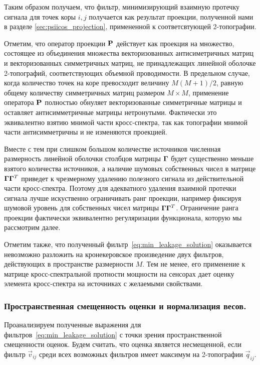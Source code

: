 Таким образом получаем, что фильтр, минимизирующий взаимную протечку сигнала
для точек коры $i, j$ получается как результат проекции, полученной нами в
разделе \ref{sec:psiicos_projection}, примененной к соответсвтующей
2-топографии.

Отметим, что оператор проекции $\mathbf{P}$ действует как проекция на множество,
состоящее из объединения множества векторизованных антисиметричных матриц и
векторизованных симметричных матриц, не принадлежащих линейной оболочке
2-топографий, соответствующих объемной проводимости. В предельном случае, когда
количество точек на коре превосходит величину $M (M + 1) / 2$, равную общему
количеству симметричных матриц размером $M \times M$, применение оператора
$\mathbf{P}$ полностью обнуляет векторизованные симметричные матрицы и оставляет
антисимметричные матрицы нетронутыми. Фактически это эквивалентно взятию
мнимой части кросс-спектра, так как топографии мнимой части антисимметричны и
не изменяются проекцией.

Вместе с тем при слишком большом количестве источников численная размерность
линейной оболочки столбцов матрицы $\mathbf{\Gamma}$ будет существенно меньше
взятого количества источников, а наличие шумовых собственных чисел в матрице
$\mathbf{\Gamma} \mathbf{\Gamma}^T$ приведет к чрезмерному удалению полезного
сигнала из действительной части кросс-спектра. Поэтому для адекватного удаления
взаимной протечки сигнала лучше искуственно ограничивать ранг проекции,
например фиксируя шумовой уровень для собственных чисел матрицы $\mathbf{\Gamma}
\mathbf{\Gamma}^T$. Ограничение ранга проекции фактически эквивалентно
регуляризации функционала, которую мы рассмотрим далее.

Отметим также, что полученный фильтр~\ref{eq:min_leakage_solution} оказывается
невозможно разложить на кронекеровское произведение двух фильтров, действующих
в пространстве размерности $M$. Тем не менее, его применение к матрице
кросс-спектральной протности мощности на сенсорах дает оценку элемента кросс-спектра на
источниках с желаемыми свойствами.

\subsubsection{Пространственная смещенность оценки и нормализация весов.}
\label{sec:psiicos_normalization_and_spatial_bias}

Проанализируем полученные выражения для фильтров~\ref{eq:min_leakage_solution}
с точки зрения пространственной смещенности оценок. Будем считать, что оценка
является несмещенной, если фильтр $\vec{v}_{ij}$ среди всех возможных фильтров
имеет максимум на 2-топографии $\vec{q}_{ij}$. 

